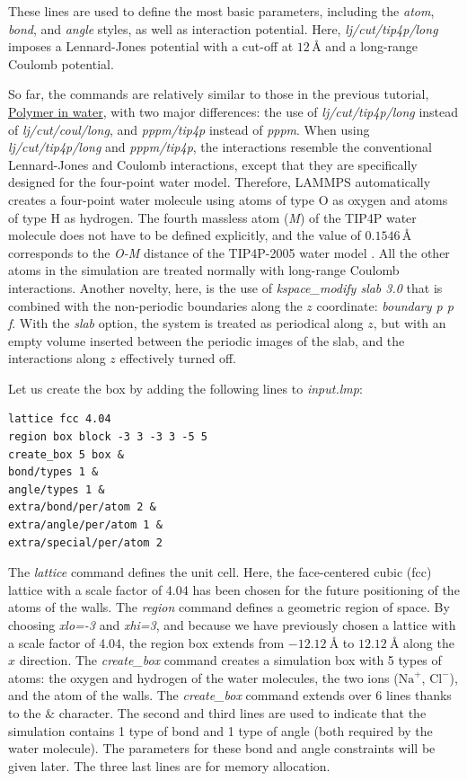 \documentclass[9pt,tutorial]{livecoms}
\begin{document}
These lines are used to define the most basic parameters, including the
\textit{atom}, \textit{bond}, and \textit{angle} styles, as well as interaction
potential. Here, \textit{lj/cut/tip4p/long} imposes a Lennard-Jones potential with
a cut-off at $12\,\text{$\text{\AA{}}$}$ and a long-range Coulomb potential.

So far, the commands are relatively similar to those in the previous tutorial,
\hyperref[all-atoms-label]{Polymer in water}, with two major differences: the use
of \textit{lj/cut/tip4p/long} instead of \textit{lj/cut/coul/long}, and \textit{pppm/tip4p}
instead of \textit{pppm}. When using \textit{lj/cut/tip4p/long} and \textit{pppm/tip4p},
the interactions resemble the conventional Lennard-Jones and Coulomb interactions,
except that they are specifically designed for the four-point water model. Therefore,
LAMMPS automatically creates a four-point water molecule using atoms of type O as
oxygen and atoms of type H as hydrogen. The fourth massless atom (\textit{M}) of the
TIP4P water molecule does not have to be defined explicitly, and the value of
$0.1546\,\text{$\text{\AA{}}$}$ corresponds to the \textit{O-M} distance of the
TIP4P-2005 water model \cite{abascal2005general}. All the other atoms in the simulation
are treated normally with long-range Coulomb interactions. Another novelty, here, is
the use of \textit{kspace\_modify slab 3.0} that is combined with the non-periodic
boundaries along the $z$ coordinate: \textit{boundary p p f}. With the \textit{slab}
option, the system is treated as periodical along $z$, but with an empty volume inserted
between the periodic images of the slab, and the interactions along $z$ effectively turned off.

Let us create the box by adding the following lines to \textit{input.lmp}:

{\normalsize \begin{verbatim}
lattice fcc 4.04
region box block -3 3 -3 3 -5 5
create_box 5 box &
bond/types 1 &
angle/types 1 &
extra/bond/per/atom 2 &
extra/angle/per/atom 1 &
extra/special/per/atom 2
\end{verbatim}}
The \textit{lattice} command defines the unit cell. Here, the face-centered cubic (fcc) lattice
with a scale factor of 4.04 has been chosen for the future positioning of the atoms
of the walls. The \textit{region} command defines a geometric region of space. By choosing
\textit{xlo=-3} and \textit{xhi=3}, and because we have previously chosen a lattice with a scale
factor of 4.04, the region box extends from $-12.12~\text{\AA{}}$ to $12.12~\text{\AA{}}$
along the $x$ direction. The \textit{create\_box} command creates a simulation box with
5 types of atoms: the oxygen and hydrogen of the water molecules, the two ions ($\text{Na}^+$,
$\text{Cl}^-$), and the atom of the walls. The \textit{create\_box} command extends over 6
lines thanks to the $\&$ character. The second and third lines are used to indicate that the
simulation contains 1 type of bond and 1 type of angle (both required by the water molecule).
The parameters for these bond and angle constraints will be given later. The three last
lines are for memory allocation.
\end{document}
